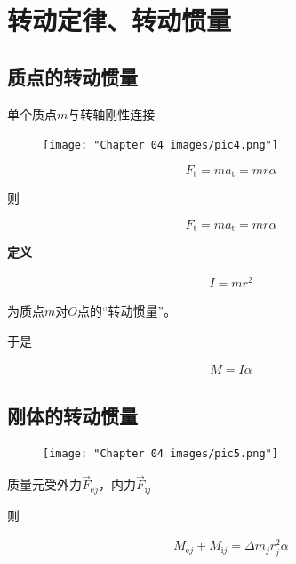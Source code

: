 \documentclass[
	12pt, %
	a4paper, %
]{myLegrandOrangeBook}
\begin{document}
\section{转动定律、转动惯量}

\subsection{质点的转动惯量}

    单个质点\(m\)与转轴刚性连接

    \begin{figure}
        \centering
        \texttt{[image: "Chapter 04 images/pic4.png"]}
        \label{pic4-4}
    \end{figure}

    $$
        F_{\mathrm{t}}=m a_{\mathrm{t}}=m r \alpha
    $$

    则

    \begin{equation}
        F_{\mathrm{t}}=m a_{\mathrm{t}}=m r \alpha
    \end{equation}

    \textbf{定义}

    \begin{align}
        I = mr^2
    \end{align}

    为质点\(m\)对\(O\)点的“转动惯量”。

    于是

    \begin{align}
        M = I \alpha
    \end{align}

\subsection{刚体的转动惯量}

    \begin{figure}
        \centering
        \texttt{[image: "Chapter 04 images/pic5.png"]}
        \label{pic4-5}
    \end{figure}

    质量元受外力\(\overrightarrow{F}_{\mathrm{e}j}\)，内力\(\overrightarrow{F}_{\mathrm{i}j}\)

    则

    \begin{align*}
        M_{\mathrm{e} j}+M_{\mathrm{i} j}=\Delta m_j r_j^2 \alpha
    \end{align*}
\end{document}
